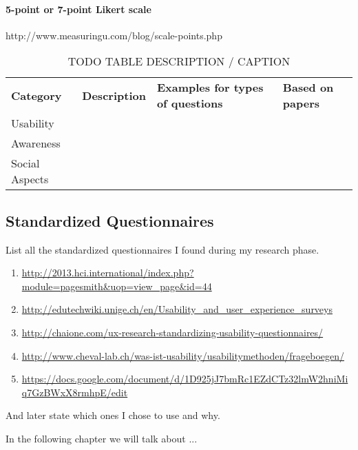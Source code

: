 \paragraph{5-point or 7-point Likert scale}
http://www.measuringu.com/blog/scale-points.php





\label{table:ASDFTODO}

\begin{table*}[htbp]
  \centering
  \caption{TODO TABLE DESCRIPTION / CAPTION}

    \begin{tabular}{llll}
    \textbf{Category}       & \textbf{Description} & \textbf{Examples for types of questions} & \textbf{Based on papers} \\
    Usability      & ~           & ~                               & ~               \\
    Awareness      & ~           & ~                               & ~               \\
    Social Aspects & ~           & ~                               & ~               \\
    \end{tabular}
    

\end{table*}





\subsection{Standardized Questionnaires}

List all the standardized questionnaires I found during my research phase.

\begin{enumerate}
\item \url{http://2013.hci.international/index.php?module=pagesmith&uop=view_page&id=44}
\item \url{http://edutechwiki.unige.ch/en/Usability_and_user_experience_surveys}
\item \url{http://chaione.com/ux-research-standardizing-usability-questionnaires/}
\item \url{http://www.cheval-lab.ch/was-ist-usability/usabilitymethoden/frageboegen/}
\item \url{https://docs.google.com/document/d/1D925jJ7bmRc1EZdCTz32lmW2hniMiq7GzBWxX8rmhpE/edit}
\end{enumerate}

And later state which ones I chose to use and why.




In the following chapter we will talk about ...